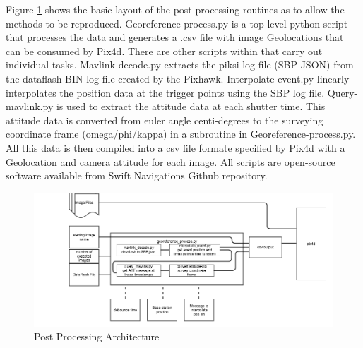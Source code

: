 \documentclass{article}
\begin{document}
Figure \ref{postprocess} shows the basic layout of the post-processing routines as to allow the methods to be reproduced.  Georeference-process.py is a top-level python script that processes the data and generates a .csv file with image Geolocations that can be consumed by Pix4d. There are other scripts within that carry out individual tasks. Mavlink-decode.py extracts the piksi log file (SBP JSON) from the dataflash BIN log file created by the Pixhawk. Interpolate-event.py linearly interpolates the position data at the trigger points using the SBP log file. Query-mavlink.py is used to extract the attitude data at each shutter time. This attitude data is converted from euler angle centi-degrees to the surveying coordinate frame (omega/phi/kappa) in a subroutine in Georeference-process.py. All this data is then compiled into a csv file formate specified by Pix4d with a Geolocation and camera attitude for each image.  All scripts are open-source software available from Swift Navigations Github repository.


\begin{figure}
\begin{center}
\includegraphics[width=7in]{images/flow_charts/uav_survey_processing_architecture.png}
\caption{Post Processing Architecture}
\label{postprocess}
\end{center}
\end{figure}
\end{document}
